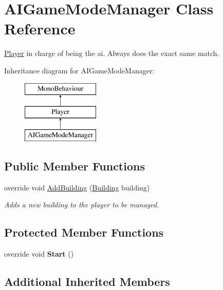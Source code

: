 \hypertarget{class_a_i_game_mode_manager}{}\section{A\+I\+Game\+Mode\+Manager Class Reference}
\label{class_a_i_game_mode_manager}


\mbox{\hyperlink{class_player}{Player}} in charge of being the ai. Always does the exact same match.  


Inheritance diagram for A\+I\+Game\+Mode\+Manager\+:\begin{figure}[H]
\begin{center}
\leavevmode
\includegraphics[height=3.000000cm]{class_a_i_game_mode_manager}
\end{center}
\end{figure}
\subsection*{Public Member Functions}
\begin{DoxyCompactItemize}
\item 
override void \mbox{\hyperlink{class_a_i_game_mode_manager_a03f995c5332cfcab0f74740034316e99}{Add\+Building}} (\mbox{\hyperlink{class_building}{Building}} building)
\begin{DoxyCompactList}\small\item\em Adds a new building to the player to be managed. \end{DoxyCompactList}\end{DoxyCompactItemize}
\subsection*{Protected Member Functions}
\begin{DoxyCompactItemize}
\item 
\mbox{\label{class_a_i_game_mode_manager_ae72ad04dd9435030767d9558b8640649}} 
override void {\bfseries Start} ()
\end{DoxyCompactItemize}
\subsection*{Additional Inherited Members}


